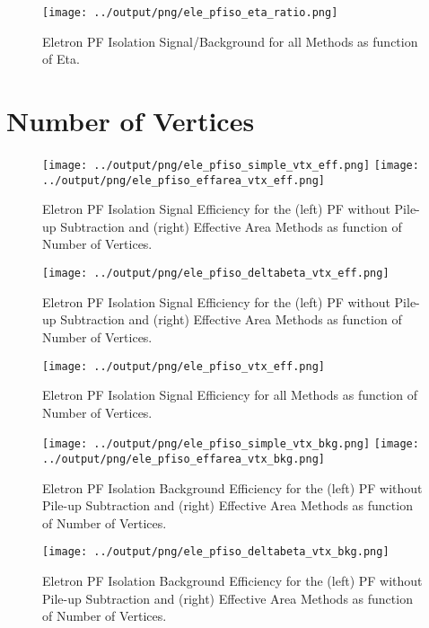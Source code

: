 \documentclass[11pt]{book}
\begin{document}
\begin{figure}[htb]
\centering
\texttt{[image: ../output/png/ele\_pfiso\_eta\_ratio.png]}
\caption{Eletron PF Isolation Signal/Background for all Methods as function of Eta.}
\label{fig:ele_pfiso_eta_ratio}
\end{figure}


\clearpage

\section{Number of Vertices}
\begin{figure}[htb]
\centering
\texttt{[image: ../output/png/ele\_pfiso\_simple\_vtx\_eff.png]}
\texttt{[image: ../output/png/ele\_pfiso\_effarea\_vtx\_eff.png]}
\caption{Eletron PF Isolation Signal Efficiency for the (left) PF without Pile-up Subtraction and (right) Effective Area Methods as function of Number of Vertices.}
\label{fig:ele_pfiso_vtx_eff_simple_effarea}
\end{figure}

\begin{figure}[htb]
\centering
\texttt{[image: ../output/png/ele\_pfiso\_deltabeta\_vtx\_eff.png]}
\caption{Eletron PF Isolation Signal Efficiency for the (left) PF without Pile-up Subtraction and (right) Effective Area Methods as function of Number of Vertices.}
\label{fig:ele_pfiso_vtx_eff_deltabeta}
\end{figure}

\begin{figure}[htb]
\centering
\texttt{[image: ../output/png/ele\_pfiso\_vtx\_eff.png]}
\caption{Eletron PF Isolation Signal Efficiency for all Methods as function of Number of Vertices.}
\label{fig:ele_pfiso_vtx_eff}
\end{figure}

\begin{figure}[htb]
\centering
\texttt{[image: ../output/png/ele\_pfiso\_simple\_vtx\_bkg.png]}
\texttt{[image: ../output/png/ele\_pfiso\_effarea\_vtx\_bkg.png]}
\caption{Eletron PF Isolation Background Efficiency for the (left) PF without Pile-up Subtraction and (right) Effective Area Methods as function of Number of Vertices.}
\label{fig:ele_pfiso_vtx_bkg_simple_effarea}
\end{figure}

\begin{figure}[htb]
\centering
\texttt{[image: ../output/png/ele\_pfiso\_deltabeta\_vtx\_bkg.png]}
\caption{Eletron PF Isolation Background Efficiency for the (left) PF without Pile-up Subtraction and (right) Effective Area Methods as function of Number of Vertices.}
\label{fig:ele_pfiso_vtx_bkg_deltabeta}
\end{figure}
\end{document}
